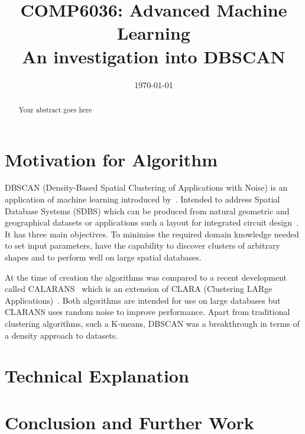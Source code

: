 \documentclass{ecsarticle}     %
\begin{document}
\frontmatter
\title      {COMP6036: Advanced Machine Learning\\[1cm]
            An investigation into DBSCAN}
      
\addresses  {\deptname\\\univname}

\date       {\today}
\subject    {}
\keywords   {}
\maketitle



\begin{abstract}
Your abstract goes here
\end{abstract}

\mainmatter


\section{Motivation for Algorithm}

DBSCAN (Density-Based Spatial Clustering of Applications with Noise) is an application of machine learning introduced by~\cite{ester96dbscan}.
Intended to address Spatial Database Systems (SDBS) which can be produced from natural geometric and geographical datasets or applications such a layout for integrated circuit design~\citep{guting94sdbs}.
It has three main objectives.
To minimise the required domain knowledge needed to set input parameters, have the capability to discover clusters of arbitrary shapes and to perform well on large spatial databases.

At the time of creation the algorithms was compared to a recent development called CALARANS~\citep{ng94clarans} which is an extension of CLARA (Clustering LARge Applications)~\citep{kaufman90clara}.
Both algorithms are intended for use on large databases but CLARANS uses random noise to improve performance.
Apart from traditional clustering algorithms, such a K-means, DBSCAN was a breakthrough in terms of a density approach to datasets.

\section{Technical Explanation}


\section{Conclusion and Further Work}



\end{document}
